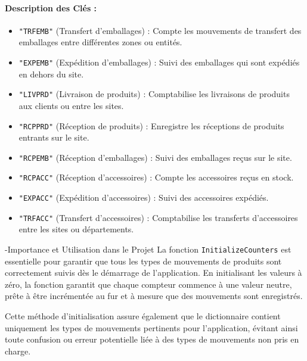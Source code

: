 \documentclass[a4paper, oneside, 12pt, final]{extreport}
\begin{document}
\paragraph{Description des Clés :}
\begin{itemize}
    \item \texttt{"TRFEMB"} (Transfert d'emballages) : Compte les mouvements de transfert des emballages entre différentes zones ou entités.
    \item \texttt{"EXPEMB"} (Expédition d'emballages) : Suivi des emballages qui sont expédiés en dehors du site.
    \item \texttt{"LIVPRD"} (Livraison de produits) : Comptabilise les livraisons de produits aux clients ou entre les sites.
    \item \texttt{"RCPPRD"} (Réception de produits) : Enregistre les réceptions de produits entrants sur le site.
    \item \texttt{"RCPEMB"} (Réception d'emballages) : Suivi des emballages reçus sur le site.
    \item \texttt{"RCPACC"} (Réception d'accessoires) : Compte les accessoires reçus en stock.
    \item \texttt{"EXPACC"} (Expédition d'accessoires) : Suivi des accessoires expédiés.
    \item \texttt{"TRFACC"} (Transfert d'accessoires) : Comptabilise les transferts d'accessoires entre les sites ou départements.
\end{itemize}

-Importance et Utilisation dans le Projet
La fonction \texttt{InitializeCounters} est essentielle pour garantir que tous les types de mouvements de produits sont correctement suivis dès le démarrage de l'application. En initialisant les valeurs à zéro, la fonction garantit que chaque compteur commence à une valeur neutre, prête à être incrémentée au fur et à mesure que des mouvements sont enregistrés.

Cette méthode d'initialisation assure également que le dictionnaire contient uniquement les types de mouvements pertinents pour l'application, évitant ainsi toute confusion ou erreur potentielle liée à des types de mouvements non pris en charge.
\end{document}
